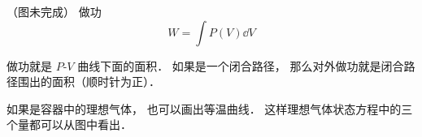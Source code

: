 

（图未完成）
做功
\begin{equation}
W = \int P(V) \dd{V}
\end{equation}

做功就是 $P$-$V$ 曲线下面的面积． 如果是一个闭合路径， 那么对外做功就是闭合路径围出的面积（顺时针为正）．

如果是容器中的理想气体， 也可以画出等温曲线． 这样理想气体状态方程中的三个量都可以从图中看出．
